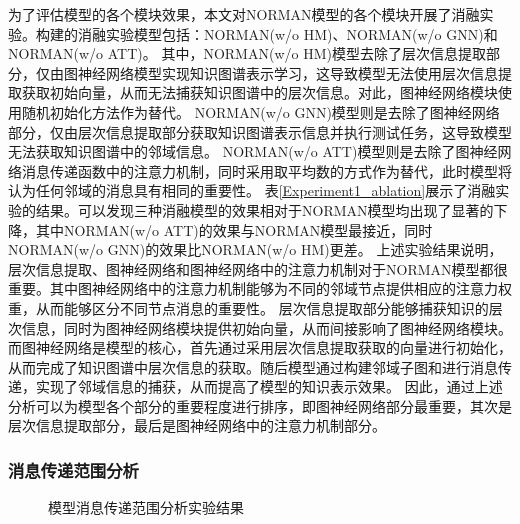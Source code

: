 \documentclass[algorithmlist, AutoFakeBold, AutoFakeSlant, figurelist, tablelist, nomlist, engineering]{seuthesix}
\begin{document}
为了评估模型的各个模块效果，本文对NORMAN模型的各个模块开展了消融实验。构建的消融实验模型包括：NORMAN(w/o HM)、NORMAN(w/o GNN)和NORMAN(w/o ATT)。
其中，NORMAN(w/o HM)模型去除了层次信息提取部分，仅由图神经网络模型实现知识图谱表示学习，这导致模型无法使用层次信息提取获取初始向量，从而无法捕获知识图谱中的层次信息。对此，图神经网络模块使用随机初始化方法作为替代。
NORMAN(w/o GNN)模型则是去除了图神经网络部分，仅由层次信息提取部分获取知识图谱表示信息并执行测试任务，这导致模型无法获取知识图谱中的邻域信息。
NORMAN(w/o ATT)模型则是去除了图神经网络消息传递函数中的注意力机制，同时采用取平均数的方式作为替代，此时模型将认为任何邻域的消息具有相同的重要性。
表\ref{Experiment1_ablation}展示了消融实验的结果。可以发现三种消融模型的效果相对于NORMAN模型均出现了显著的下降，其中NORMAN(w/o ATT)的效果与NORMAN模型最接近，同时NORMAN(w/o GNN)的效果比NORMAN(w/o HM)更差。
上述实验结果说明，层次信息提取、图神经网络和图神经网络中的注意力机制对于NORMAN模型都很重要。其中图神经网络中的注意力机制能够为不同的邻域节点提供相应的注意力权重，从而能够区分不同节点消息的重要性。
层次信息提取部分能够捕获知识的层次信息，同时为图神经网络模块提供初始向量，从而间接影响了图神经网络模块。
而图神经网络是模型的核心，首先通过采用层次信息提取获取的向量进行初始化，从而完成了知识图谱中层次信息的获取。随后模型通过构建邻域子图和进行消息传递，实现了邻域信息的捕获，从而提高了模型的知识表示效果。
因此，通过上述分析可以为模型各个部分的重要程度进行排序，即图神经网络部分最重要，其次是层次信息提取部分，最后是图神经网络中的注意力机制部分。

\subsubsection{消息传递范围分析}
\begin{figure}[t]
  \centering
  \caption{模型消息传递范围分析实验结果}
  \label{Experiment1_messageRange}
\end{figure}
\end{document}
